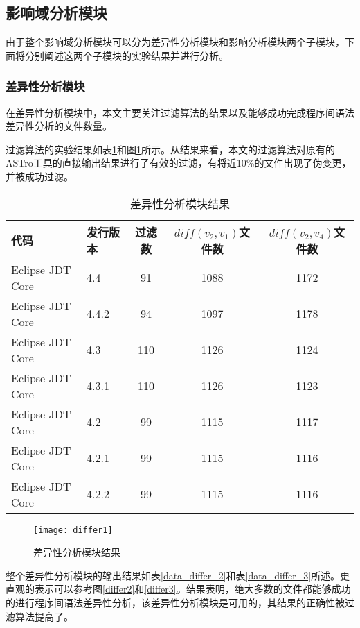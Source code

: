 \subsection{影响域分析模块}

由于整个影响域分析模块可以分为差异性分析模块和影响分析模块两个子模块，下面将分别阐述这两个子模块的实验结果并进行分析。

\subsubsection{差异性分析模块}

在差异性分析模块中，本文主要关注过滤算法的结果以及能够成功完成程序间语法差异性分析的文件数量。

过滤算法的实验结果如表\ref {data_differ_1}和图\ref {differ1}所示。从结果来看，本文的过滤算法对原有的ASTro工具的直接输出结果进行了有效的过滤，有将近10\%的文件出现了伪变更，并被成功过滤。

\begin{table}[H]
	\caption{差异性分析模块结果}
	\label{data_differ_1}
	\centering
	\begin{tabular}{llccc}
		\toprule[1.5pt]
		{\heiti 代码} & {\heiti 发行版本} & {\heiti 过滤数} & {\heiti $diff(v_2,v_1)$文件数} & {\heiti $diff(v_2,v_4)$文件数} \\\midrule[1pt]
		Eclipse JDT Core & 4.4	& 91 & 1088 & 1172	\\		
		Eclipse JDT Core & 4.4.2 & 94 & 1097 & 1178		\\
		Eclipse JDT Core & 4.3 	& 110 & 1126 & 1124			\\
		Eclipse JDT Core & 4.3.1 & 110 & 1126 & 1123			\\
		Eclipse JDT Core & 4.2 	& 99 & 1115 & 1117		\\
		Eclipse JDT Core & 4.2.1 & 99 & 1115 & 1116			\\
		Eclipse JDT Core & 4.2.2 & 99 & 1115 & 1116		\\
		\bottomrule[1.5pt]
	\end{tabular}
\end{table}

\begin{figure}[H]
	\centering
	\texttt{[image: differ1]}
	\caption {差异性分析模块结果}
	\label {differ1}	
\end{figure}


整个差异性分析模块的输出结果如表\ref {data_differ_2}和表\ref {data_differ_3}所述。更直观的表示可以参考图\ref {differ2}和\ref {differ3}。结果表明，绝大多数的文件都能够成功的进行程序间语法差异性分析，该差异性分析模块是可用的，其结果的正确性被过滤算法提高了。

